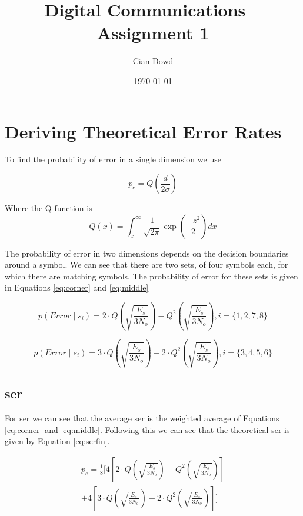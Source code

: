 \documentclass[A4, 12pt]{article}
\title{Digital Communications -- Assignment 1}
\author{Cian Dowd}
\date{\today}
\begin{document}
\maketitle

\section{Deriving Theoretical Error Rates}
To find the probability of error in a single dimension we use

\begin{equation*}
	p_e = Q \left( \frac{d}{2 \sigma} \right)
\end{equation*}

Where the Q function is 
\begin{equation*}
	Q(x) = \int_{x}^{\infty} \frac{1}{\sqrt{2\pi}} \exp \left(\frac{-z^2}{2} \right) dx
\end{equation*}

The probability of error in two dimensions depends on the decision boundaries around a symbol.
We can see that there are two sets, of four symbols each, for which there are matching symbols.
The probability of error for these sets is given in Equations \ref{eq:corner} and \ref{eq:middle}

\begin{equation}
	p(Error \mid s_i) = 2 \cdot Q \left( \sqrt{ \frac{E_s}{3 N_o} } \right) - Q^2 \left( \sqrt{ \frac{E_s}{3 N_o} } \right) , i = \{1,2,7,8\}
	\label{eq:corner}
\end{equation}

\begin{equation}
	p(Error \mid s_i) = 3 \cdot Q \left( \sqrt{ \frac{E_s}{3 N_o} } \right) - 2 \cdot Q^2 \left( \sqrt{ \frac{E_s}{3 N_o} } \right) , i = \{3,4,5,6\}
	\label{eq:middle}
\end{equation}

\subsection{\ac{ser}}
For \ac{ser} we can see that the average \ac{ser} is the weighted average of Equations \ref{eq:corner} and \ref{eq:middle}.
Following this we can see that the theoretical \ac{ser} is given by Equation \ref{eq:serfin}.

\begin{equation*}
	\begin{split}
		p_e = \frac{1}{8}
		\Bigg[
			4 \left[ 2 \cdot Q \left( \sqrt{ \frac{E_s}{3 N_o} } \right) - Q^2 \left( \sqrt{ \frac{E_s}{3 N_o} } \right) \right]\\
			+ 4 \left[ 3 \cdot Q \left( \sqrt{ \frac{E_s}{3 N_o} } \right) - 2 \cdot Q^2 \left( \sqrt{ \frac{E_s}{3 N_o} } \right) \right]
		\Bigg]
	\end{split}
\end{equation*}
\end{document}
